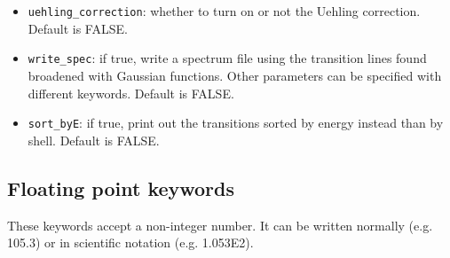\documentclass[]{article}
\begin{document}
\begin{itemize}
	\item \texttt{uehling\_correction}: whether to turn on or not the Uehling correction. Default is FALSE.
	\item \texttt{write\_spec}: if true, write a spectrum file using the transition lines found broadened with Gaussian functions. Other parameters can be specified with different keywords. Default is FALSE.
	\item \texttt{sort\_byE}: if true, print out the transitions sorted by energy instead than by shell. Default is FALSE.
\end{itemize}

\subsection{Floating point keywords}

These keywords accept a non-integer number. It can be written normally (e.g. 105.3) or in scientific notation (e.g. 1.053E2).
\end{document}
